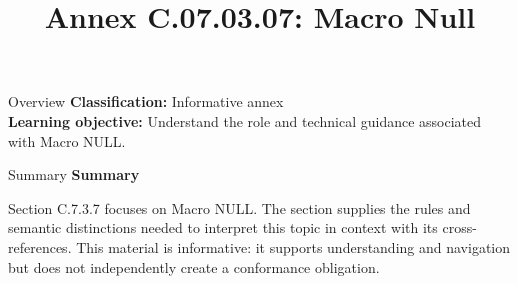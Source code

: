 \documentclass[10pt,letterpaper]{article}
\title{Annex C.07.03.07: Macro Null}
\author{}
\date{}
\begin{document}
\maketitle
\begin{CornellOverviewBox}{Overview}
\textbf{Classification:} Informative annex\\[2pt]
\textbf{Learning objective:} Understand the role and technical guidance associated with Macro NULL.
\end{CornellOverviewBox}\begin{CornellSummaryBox}{Summary}
{\sffamily\bfseries\color{Accent} Summary}\par\vspace{3pt}Section C.7.3.7 focuses on Macro NULL. The section supplies the rules and semantic distinctions needed to interpret this topic in context with its cross-references. This material is informative: it supports understanding and navigation but does not independently create a conformance obligation.
\end{CornellSummaryBox}
\end{document}
